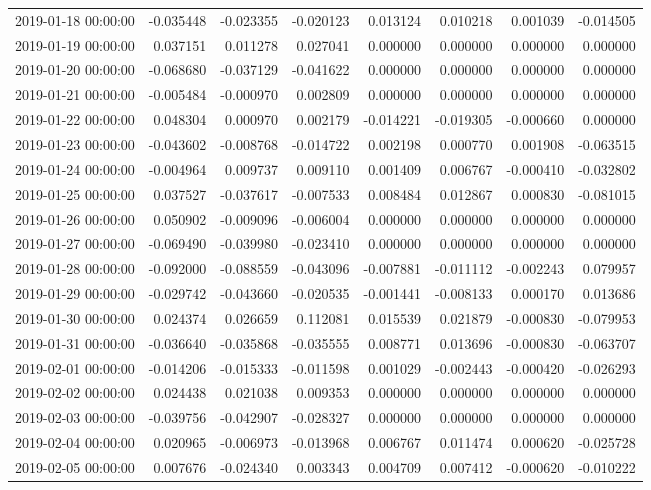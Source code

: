 \begin{tabular}{lrrrrrrr}
2019-01-18 00:00:00 & -0.035448 & -0.023355 & -0.020123 & 0.013124 & 0.010218 & 0.001039 & -0.014505 \\
2019-01-19 00:00:00 & 0.037151 & 0.011278 & 0.027041 & 0.000000 & 0.000000 & 0.000000 & 0.000000 \\
2019-01-20 00:00:00 & -0.068680 & -0.037129 & -0.041622 & 0.000000 & 0.000000 & 0.000000 & 0.000000 \\
2019-01-21 00:00:00 & -0.005484 & -0.000970 & 0.002809 & 0.000000 & 0.000000 & 0.000000 & 0.000000 \\
2019-01-22 00:00:00 & 0.048304 & 0.000970 & 0.002179 & -0.014221 & -0.019305 & -0.000660 & 0.000000 \\
2019-01-23 00:00:00 & -0.043602 & -0.008768 & -0.014722 & 0.002198 & 0.000770 & 0.001908 & -0.063515 \\
2019-01-24 00:00:00 & -0.004964 & 0.009737 & 0.009110 & 0.001409 & 0.006767 & -0.000410 & -0.032802 \\
2019-01-25 00:00:00 & 0.037527 & -0.037617 & -0.007533 & 0.008484 & 0.012867 & 0.000830 & -0.081015 \\
2019-01-26 00:00:00 & 0.050902 & -0.009096 & -0.006004 & 0.000000 & 0.000000 & 0.000000 & 0.000000 \\
2019-01-27 00:00:00 & -0.069490 & -0.039980 & -0.023410 & 0.000000 & 0.000000 & 0.000000 & 0.000000 \\
2019-01-28 00:00:00 & -0.092000 & -0.088559 & -0.043096 & -0.007881 & -0.011112 & -0.002243 & 0.079957 \\
2019-01-29 00:00:00 & -0.029742 & -0.043660 & -0.020535 & -0.001441 & -0.008133 & 0.000170 & 0.013686 \\
2019-01-30 00:00:00 & 0.024374 & 0.026659 & 0.112081 & 0.015539 & 0.021879 & -0.000830 & -0.079953 \\
2019-01-31 00:00:00 & -0.036640 & -0.035868 & -0.035555 & 0.008771 & 0.013696 & -0.000830 & -0.063707 \\
2019-02-01 00:00:00 & -0.014206 & -0.015333 & -0.011598 & 0.001029 & -0.002443 & -0.000420 & -0.026293 \\
2019-02-02 00:00:00 & 0.024438 & 0.021038 & 0.009353 & 0.000000 & 0.000000 & 0.000000 & 0.000000 \\
2019-02-03 00:00:00 & -0.039756 & -0.042907 & -0.028327 & 0.000000 & 0.000000 & 0.000000 & 0.000000 \\
2019-02-04 00:00:00 & 0.020965 & -0.006973 & -0.013968 & 0.006767 & 0.011474 & 0.000620 & -0.025728 \\
2019-02-05 00:00:00 & 0.007676 & -0.024340 & 0.003343 & 0.004709 & 0.007412 & -0.000620 & -0.010222 \\

\end{tabular}
